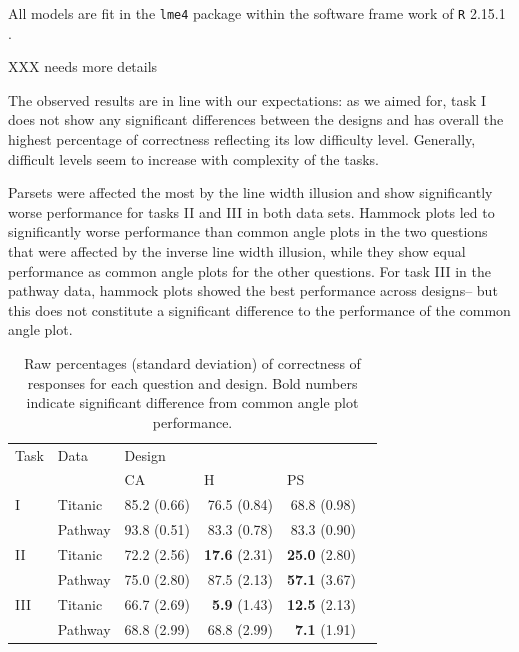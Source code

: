 All models are fit in the {\tt lme4} package \cite{lmer} within the software frame work of {\tt R} 2.15.1 \cite{R}.

XXX needs more details

The observed results are in line with our expectations:
as we aimed for, task I does not show any significant differences between the designs and has overall the highest percentage of correctness reflecting its low difficulty level. Generally, difficult levels seem to increase with complexity of the tasks.

Parsets were affected the most by the line width illusion and show significantly worse performance for tasks II and III in both data sets. 
Hammock plots led to significantly worse performance than common angle plots in the two questions that were affected by the inverse line width illusion, while they show equal performance as common angle plots for the other questions. For task III in the pathway data,  hammock plots showed the best performance  across designs-- but this  does not  constitute a significant difference to the performance of the common angle plot.



%
\begin{table}[ht]
\begin{center}
\begin{tabular}{llrrrr}
  \hline
Task & Data & \multicolumn{3}{l}{Design} \\
& & \multicolumn{1}{l}{CA} & \multicolumn{1}{l}{H}  & \multicolumn{1}{l}{PS}  \\ 
  \hline
 I & Titanic & 85.2 (0.66) & 76.5 (0.84) & 68.8 (0.98) \\ 
& Pathway & 93.8 (0.51) & 83.3 (0.78) & 83.3 (0.90) \\ [3pt]
 II& Titanic & 72.2 (2.56) & {\bf 17.6} (2.31) & {\bf 25.0} (2.80) \\ 
& Pathway & 75.0 (2.80) & 87.5 (2.13) & {\bf 57.1} (3.67) \\ [3pt]
III & Titanic & 66.7 (2.69) & {\bf  5.9} (1.43) & {\bf 12.5} (2.13) \\ 
& Pathway & 68.8 (2.99) & 68.8 (2.99) & {\bf 7.1} (1.91) \\ \hline
\end{tabular}
\end{center}
\caption{\label{raw} Raw percentages (standard deviation) of correctness of responses for each question and design. Bold numbers indicate significant difference from common angle plot performance.  }
\end{table}

